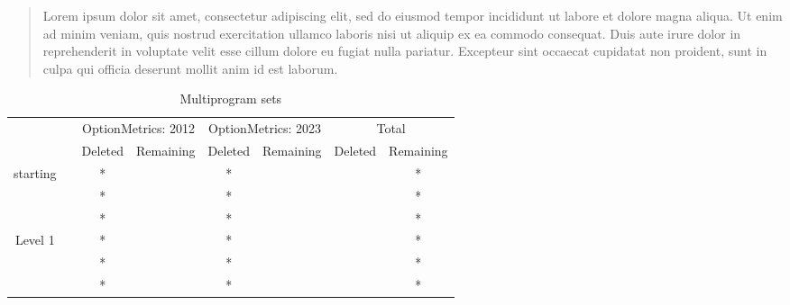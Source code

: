 \newcommand*{\MyHeaderPath}{.}%
\newcommand*{\PathToAssets}{../assets}%
\newcommand*{\PathToOutput}{../output/}%













\begin{abstract}
Lorem ipsum dolor sit amet, consectetur adipiscing elit, sed do eiusmod tempor
incididunt ut labore et dolore magna aliqua. Ut enim ad minim veniam, quis
nostrud exercitation ullamco laboris nisi ut aliquip ex ea commodo consequat.
Duis aute irure dolor in reprehenderit in voluptate velit esse cillum dolore
eu fugiat nulla pariatur. Excepteur sint occaecat cupidatat non proident,
sunt in culpa qui officia deserunt mollit anim id est laborum.
\end{abstract}



\begin{table}
    \centering
    \caption{Multiprogram sets}
    \label{multiprogram}
    \begin{tabular}{c c c c c c c c }
       
        
         \multicolumn{1}{c}{} &  \multicolumn{1}{c}{} & \multicolumn{2}{c}{OptionMetrics: 2012} & \multicolumn{2}{c}{OptionMetrics: 2023} & \multicolumn{2}{c}{Total} \\
         \cline{3-4}
                  
         \cline{5-6}
         \cline{7-8}
         
          &  & Deleted & Remaining & Deleted & Remaining & Deleted & Remaining \\

       \hline
       starting & & * &  & * &  &  & * \\
       & & * &  & * &  &  & * \\
       & & * &  & * &  &  & * \\
        \hline
        Level 1 & & * &  & * &  &  & * \\
       & & * &  & * &  &  & * \\
       & & * &  & * &  &  & * \\ 
        \hline
    \end{tabular}
\end{table}



